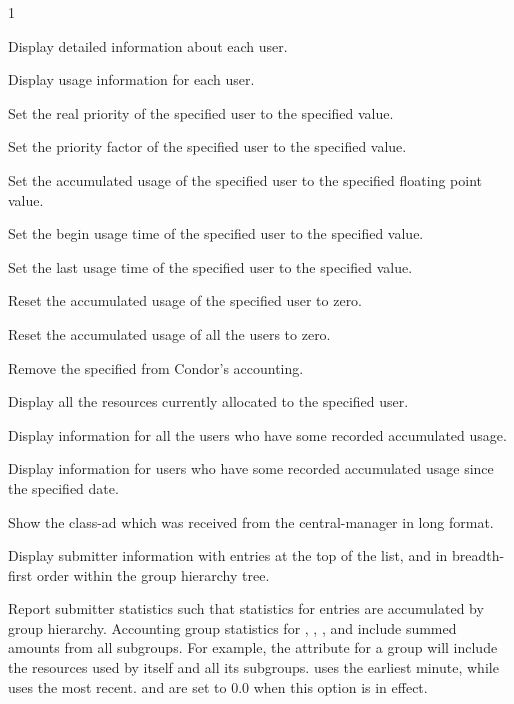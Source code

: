\begin{ManPage}{\label{man-condor-userprio}}{1}
\begin{Options}
	{Display detailed information about each user.}

	{Display usage information for each user.}

	{Set the real priority of the specified user to the specified value.}

	{Set the priority factor of the specified user to the specified value.}

	{Set the accumulated usage of the specified user to the specified floating
     point value.}

	{Set the begin usage time of the specified user to the specified value.}

	{Set the last usage time of the specified user to the specified value.}

	{Reset the accumulated usage of the specified user to zero.}

	{Reset the accumulated usage of all the users to zero.}

	{Remove the specified  from Condor's accounting.}

	{Display all the resources currently allocated to the specified user.}

	{Display information for all the users who have some recorded accumulated usage.}

	{Display information for users who have some recorded accumulated usage since
the specified date.}

	{Show the class-ad which was received from the central-manager in long format.}

	{Display submitter information with  entries 
	at the top of the list, and in breadth-first order within 
	the group hierarchy tree.}

	{Report submitter statistics such that statistics for 
	 entries are accumulated by group hierarchy.
	Accounting group statistics for , 
	, , 
	and  include summed amounts from
	all subgroups. 
	For example, the  attribute for a group will 
	include the resources used by itself and all its subgroups.
	 uses the earliest minute,
	while  uses the most recent.
	 and  are set to 0.0 
	when this option is in effect.}


\end{Options}
\end{ManPage}
